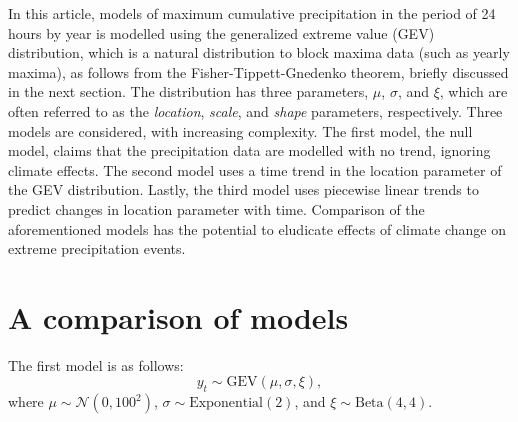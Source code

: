 \documentclass[12pt, a4paper]{article}
\begin{document}
  In this article, models of maximum cumulative precipitation in the period of
  24 hours by year is modelled using the generalized extreme value (GEV)
  distribution, which is a natural distribution to block maxima data (such as
  yearly maxima), as follows from the Fisher-Tippett-Gnedenko theorem, briefly
  discussed in the next section. The distribution has three parameters,
  \(\mu\), \(\sigma\), and \(\xi\), which are often referred to as the 
  \textit{location}, \textit{scale}, and \textit{shape} parameters,
  respectively. Three models are considered, with increasing complexity. The
  first model, the null model, claims that the precipitation data are
  modelled with no trend, ignoring climate effects. The second model uses a
  time trend in the location parameter of the GEV distribution. Lastly, the 
  third model uses piecewise linear trends to predict changes in location
  parameter with time. Comparison of the aforementioned models has the
  potential to eludicate effects of climate change on extreme precipitation
  events.

  \section{A comparison of models}
  The first model is as follows:
  \[
    y_t \sim \mathrm{GEV}(\mu, \sigma, \xi),
  \]
  where \(\mu \sim \mathcal N(0, 100^2)\), 
  \(\sigma \sim \mathrm{Exponential(2)}\), and 
  \(\xi \sim \mathrm{Beta}(4, 4)\).
  
\end{document}
